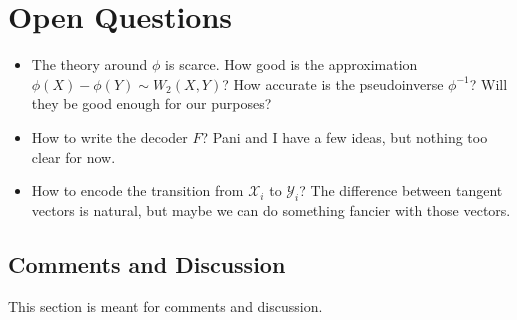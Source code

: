 \documentclass{article}
\begin{document}
\section{Open Questions}
\begin{itemize}
    \item The theory around $\phi$ is scarce. How good is the approximation $\phi(X) - \phi(Y)\sim W_2(X,Y)$? How accurate is the pseudoinverse $\phi^{-1}$? Will they be good enough for our purposes?
    \item How to write the decoder $F$? Pani and I have a few ideas, but nothing too clear for now.
    \item How to encode the transition from $\mathcal{X}_i$ to $\mathcal{Y}_i$? The difference between tangent vectors is natural, but maybe we can do something fancier with those vectors.
\end{itemize}

\subsection{Comments and Discussion}

This section is meant for comments and discussion.



\end{document}
